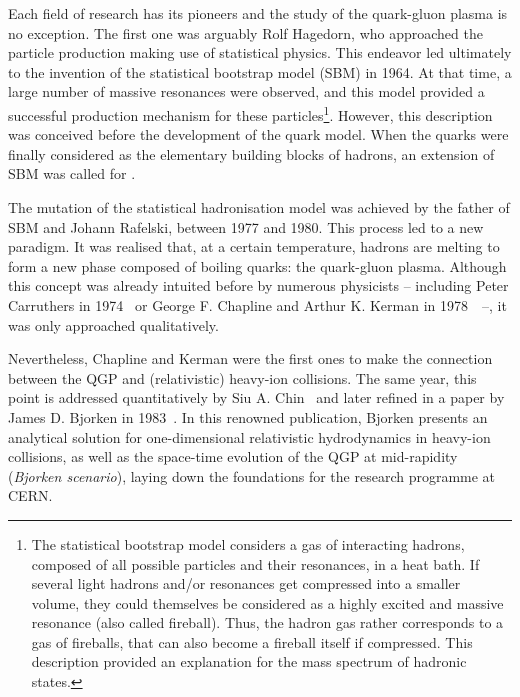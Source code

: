 Each field of research has its pioneers and the study of the quark-gluon plasma is no exception. The first one was arguably Rolf Hagedorn, who approached the particle production making use of statistical physics. This endeavor led ultimately to the invention of the statistical bootstrap model (SBM) in 1964. At that time, a large number of massive resonances were observed, and this model provided a successful production mechanism for these particles\footnote{The statistical bootstrap model considers a gas of interacting hadrons, composed of all possible particles and their resonances, in a heat bath. If several light hadrons and/or resonances get compressed into a smaller volume, they could themselves be considered as a highly excited and massive resonance (also called fireball). Thus, the hadron gas rather corresponds to a gas of fireballs, that can also become a fireball itself if compressed. This description provided an explanation for the mass spectrum of hadronic states.}. However, this description was conceived before the development of the quark model. When the quarks were finally considered as the elementary building blocks of hadrons, an extension of SBM was called for \cite{rafelskiMeltingHadronsBoiling2015a}.

The mutation of the statistical hadronisation model was achieved by the father of SBM and Johann Rafelski, between 1977 and 1980. This process led to a new paradigm. It was realised that, at a certain temperature, hadrons are melting to form a new phase composed of boiling quarks: the quark-gluon plasma. Although this concept was already intuited before by numerous physicists -- including Peter Carruthers in 1974~\cite{rafelskiMeltingHadronsBoiling2015} or George F. Chapline and Arthur K. Kerman in 1978~\cite{chaplinePossibilityMakingQuark1978}~--, it was only approached qualitatively.

Nevertheless, Chapline and Kerman were the first ones to make the connection between the QGP and (relativistic) heavy-ion collisions. The same year, this point is addressed quantitatively by Siu A. Chin~\cite{chinTransitionHotQuark1978a} and later refined in a paper by James D. Bjorken in 1983~\cite{bjorkenHighlyRelativisticNucleusnucleus1983}. In this renowned publication, Bjorken presents an analytical solution for one-dimensional relativistic hydrodynamics in heavy-ion collisions, as well as the space-time evolution of the QGP at mid-rapidity (\textit{Bjorken scenario}), laying down the foundations for the research programme at CERN.\\

